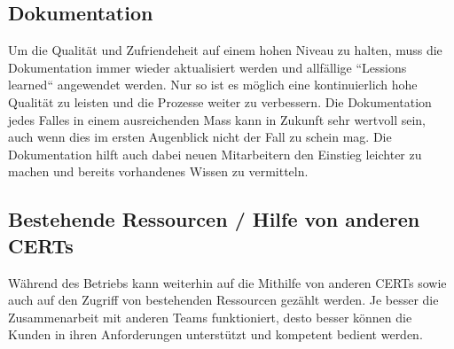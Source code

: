 \subsection{Dokumentation}
Um die Qualität und Zufriendeheit auf einem hohen Niveau zu halten, muss die Dokumentation immer wieder aktualisiert werden und allfällige ``Lessions learned`` angewendet werden. Nur so ist es möglich eine kontinuierlich hohe Qualität zu leisten und die Prozesse weiter zu verbessern. Die Dokumentation jedes Falles in einem ausreichenden Mass kann in Zukunft sehr wertvoll sein, auch wenn dies im ersten Augenblick nicht der Fall zu schein mag. Die Dokumentation hilft auch dabei neuen Mitarbeitern den Einstieg leichter zu machen und bereits vorhandenes Wissen zu vermitteln.

\subsection{Bestehende Ressourcen / Hilfe von anderen CERTs}
Während des Betriebs kann weiterhin auf die Mithilfe von anderen CERTs sowie auch auf den Zugriff von bestehenden Ressourcen gezählt werden. Je besser die Zusammenarbeit mit anderen Teams funktioniert, desto besser können die Kunden in ihren Anforderungen unterstützt und kompetent bedient werden.


